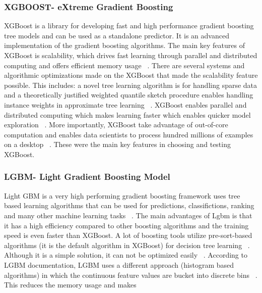 \documentclass[journal,twoside,web]{ieeecolor}
\begin{document}
\subsubsection{XGBOOST- eXtreme Gradient Boosting}
XGBoost is a library for developing fast and high performance gradient boosting tree models and can be used as a standalone predictor. It is an advanced implementation of the gradient boosting algorithms. The main key features of XGBoost is scalability, which drives fast learning through parallel and distributed computing and offers efficient memory usage ~\cite{kdnuggets_analytics_big_data_data_mining_and_data_science}. There are several systems and algorithmic optimizations made on the XGBoost that made the scalability feature possible. This includes: a novel tree learning algorithm is for handling sparse data and a theoretically justified weighted quantile sketch procedure enables handling instance weights in approximate tree learning ~\cite{kdnuggets_analytics_big_data_data_mining_and_data_science}. XGBoost enables parallel and distributed computing which makes learning faster which enables quicker model exploration ~\cite{kdnuggets_analytics_big_data_data_mining_and_data_science}. More importantly, XGBoost take advantage of out-of-core computation and enables data scientists to process hundred millions of examples on a desktop ~\cite{kdnuggets_analytics_big_data_data_mining_and_data_science}. These were the main key features in choosing and testing XGBoost. 

\subsubsection{LGBM- Light Gradient Boosting Model} 
Light GBM is a very high performing gradient boosting framework uses tree based learning algorithms that can be used for predictions, classifictions, ranking and many other machine learning tasks ~\cite{lightgbm_documentation}. The main advantages of Lgbm is that it has a high efficiency compared to other boosting algorithms and the training speed is even faster than XGBoost. A lot of boosting tools utilize pre-sort-based algorithms (it is the default algorithm in XGBoost) for decision tree learning ~\cite{mehta1996sliq}. Although it is a simple solution, it can not be optimized easily ~\cite{lightgbm_documentation}. According to LGBM documentation, LGBM uses a different approach (histogram based algorithms) in which the continuous feature values are bucket into discrete bins ~\cite{lightgbm_documentation}. This reduces the memory usage and makes
\end{document}
